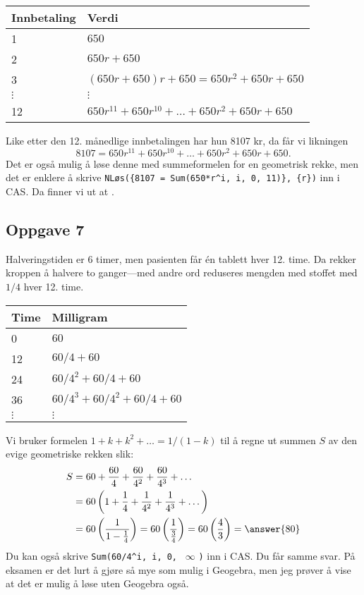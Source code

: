 \begin{easylist}[enumerate]
	\begin{center}
		\begin{tabular}{ll}
			Innbetaling & Verdi\\ \hline
			1 &  $650 $ \\
			2 &  $650 r + 650 $ \\
			3 &  $(650 r + 650)r + 650 = 650r^2 + 650r + 650 $ \\
			$\vdots$ & $\vdots$ \\
			12 & $650r^{11} + 650r^{10} + \dots + 650r^{2} + 650r + 650$ \\
		\end{tabular}
	\end{center}
	Like etter den 12. månedlige innbetalingen har hun 8107 kr,
	da får vi likningen 
	\begin{equation*}
		8107 = 650r^{11} + 650r^{10} + \dots + 650r^{2} + 650r + 650.
	\end{equation*}
	Det er også mulig å løse denne med summeformelen for en geometrisk rekke,
	men det er enklere å skrive \verb|NLøs({8107 = Sum(650*r^i, i, 0, 11)}, {r})| inn i CAS. Da finner vi ut at .
\end{easylist}

\subsection*{Oppgave 7}
Halveringstiden er 6 timer, men pasienten får én tablett hver 12. time.
Da rekker kroppen å halvere to ganger---med andre ord reduseres mengden med stoffet med $1/4$ hver 12. time.

\begin{center}
	\begin{tabular}{ll}
		Time & Milligram\\ \hline
		0 &  $60 $ \\
		12 &  $60/4 + 60$ \\
		24 &  $60/4^2 + 60/4 + 60$ \\
		36 &  $60/4^3 + 60/4^2 + 60/4 + 60$ \\
		$\vdots$ & $\vdots$
	\end{tabular}
\end{center}
Vi bruker formelen $1 + k + k^2 + \dots = 1 /(1 - k)$ til å regne ut summen $S$ av den evige geometriske rekken slik:
\begin{align*} 
	S &= 60 + \frac{60}{4}  + \frac{60}{4^2}  + \frac{60}{4^3} + \dots \\
	&= 60 \left( 1 +\frac{1}{4} + \frac{1}{4^2} + \frac{1}{4^3} + \dots  \right) \\
	&= 60 \left(  \frac{1}{1 - \frac{1}{4}}\right) = 60 \left(  \frac{1}{ \frac{3}{4}}\right)= 60 \left(  \frac{4}{ 3}\right)  = \answer{80}\\
\end{align*}
Du kan også skrive
\verb|Sum(60/4^i, i, 0, | $\infty$ \verb|)| inn i CAS. Du får samme svar.
På eksamen er det lurt å gjøre så mye som mulig i Geogebra,
men jeg prøver å vise at det er mulig å løse uten Geogebra også.





